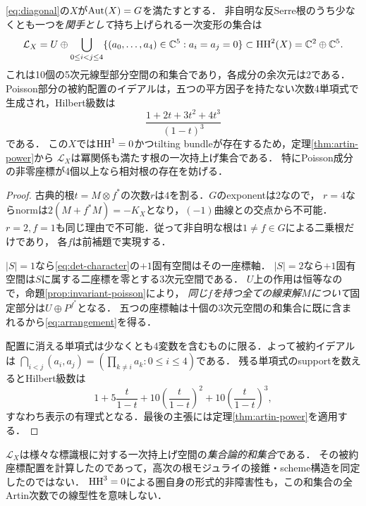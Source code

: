 \begin{theorem}[一次持上げ部分空間の配置]\label{thm:degree4-arrangement}
\eqref{eq:diagonal}の$X$が$\operatorname{Aut}(X)=G$を満たすとする．
非自明な反Serre根のうち少なくとも一つを\emph{関手として}持ち上げられる一次変形の集合は
\begin{equation}\label{eq:arrangement}
 \mathcal L_X=U\oplus\bigcup_{0\le i<j\le4}\{(a_0,\ldots,a_4)\in\mathbb C^5:a_i=a_j=0\}
 \subset\operatorname{HH}^2(X)=\mathbb C^2\oplus\mathbb C^5.
\end{equation}
これは10個の5次元線型部分空間の和集合であり，各成分の余次元は2である．
Poisson部分の被約配置のイデアルは，五つの平方因子を持たない次数4単項式で生成され，Hilbert級数は
\[
 \frac{1+2t+3t^2+4t^3}{(1-t)^3}
\]
である．
この$X$では$\operatorname{HH}^1=0$かつtilting bundleが存在するため，定理\ref{thm:artin-power}から
$\mathcal L_X$は冪関係も満たす根の一次持上げ集合である．
特にPoisson成分の非零座標が4個以上なら相対根の存在を妨げる．
\end{theorem}
\begin{proof}
古典的根$t=M\otimes f^*$の次数$r$は$4$を割る．$G$のexponentは2なので，
$r=4$ならnormは$2(M+f^*M)=-K_X$となり，$(-1)$曲線との交点から不可能．
$r=2,f=1$も同じ理由で不可能．従って非自明な根は$1\ne f\in G$による二乗根だけであり，
各$f$は前補題で実現する．

$|S|=1$なら\eqref{eq:det-character}の$+1$固有空間はその一座標軸．
$|S|=2$なら$+1$固有空間は$S$に属する二座標を零とする3次元空間である．
$U$上の作用は恒等なので，命題\ref{prop:invariant-poisson}により，
\emph{同じ$f$を持つ全ての線束解$M$について}固定部分は$U\oplus P^{f^*}$となる．
五つの座標軸は十個の3次元空間の和集合に既に含まれるから\eqref{eq:arrangement}を得る．

配置に消える単項式は少なくとも4変数を含むものに限る．よって被約イデアルは
$\bigcap_{i<j}(a_i,a_j)=(\prod_{k\ne i}a_k:0\le i\le4)$である．
残る単項式のsupportを数えるとHilbert級数は
\[
 1+5\frac{t}{1-t}+10\left(\frac{t}{1-t}\right)^2+
 10\left(\frac{t}{1-t}\right)^3,
\]
すなわち表示の有理式となる．最後の主張には定理\ref{thm:artin-power}を適用する．
\end{proof}

\begin{remark}[scheme構造を主張しない]
$\mathcal L_X$は様々な標識根に対する一次持上げ空間の\emph{集合論的和集合}である．
その被約座標配置を計算したのであって，高次の根モジュライの接錐・scheme構造を同定したのではない．
$\operatorname{HH}^3=0$による圏自身の形式的非障害性も，この和集合の全Artin次数での線型性を意味しない．
\end{remark}

